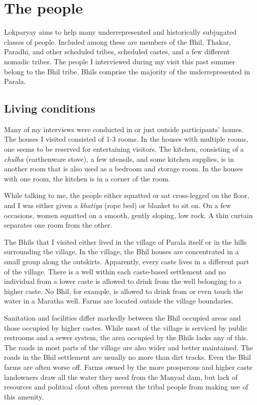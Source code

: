 \documentclass[report.tex]{subfiles}
\begin{document}
\section{The people}

Lokparyay aims to help many underrepresented and historically subjugated classes of people. Included among these are members of the Bhil, Thakar, Paradhi, and other scheduled tribes, scheduled castes, and a few different nomadic tribes. The people I interviewed during my visit this past summer belong to the Bhil tribe. Bhils comprise the majority of the underrepresented in Parala.

\subsection{Living conditions}

Many of my interviews were conducted in or just outside participants' homes. The houses I visited consisted of 1-3 rooms. In the houses with multiple rooms, one seems to be reserved for entertaining visitors. The kitchen, consisting of a \textit{chulha} (earthenware stove), a few utensils, and some kitchen supplies, is in another room that is also used as a bedroom and storage room. In the houses with one room, the kitchen is in a corner of the room.

While talking to me, the people either squatted or sat cross-legged on the floor, and I was either given a \textit{khatiya} (rope bed) or blanket to sit on. On a few occasions, women squatted on a smooth, gently sloping, low rock. A thin curtain separates one room from the other.

The Bhils that I visited either lived in the village of Parala itself or in the hills surrounding the village. In the village, the Bhil houses are concentrated in a small group along the outskirts. Apparently, every caste lives in a different part of the village. There is a well within each caste-based settlement and no individual from a lower caste is allowed to drink from the well belonging to a higher caste. No Bhil, for example, is allowed to drink from or even touch the water in a Maratha well. Farms are located outside the village boundaries.

Sanitation and facilities differ markedly between the Bhil occupied areas and those occupied by higher castes. While most of the village is serviced by public restrooms and a sewer system, the area occupied by the Bhils lacks any of this. The roads in most parts of the village are also wider and better maintained. The roads in the Bhil settlement are usually no more than dirt tracks. Even the Bhil farms are often worse off. Farms owned by the more prosperous and higher caste landowners draw all the water they need from the Manyad dam, but lack of resources and political clout often prevent the tribal people from making use of this amenity.
\end{document}
